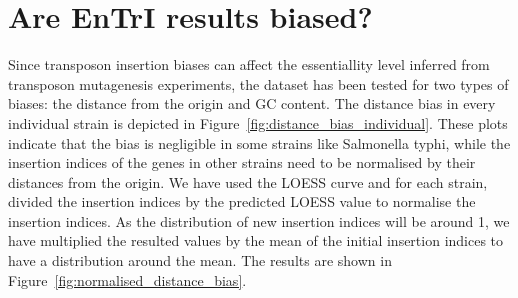 \documentclass[a4paper,10pt, twocolumn]{article}
\begin{document}
\section{Are EnTrI results biased?}
Since transposon insertion biases can affect the essentiallity level inferred from transposon mutagenesis experiments, the dataset has been tested for two types of biases: the distance from the origin and GC content.
The distance bias in every individual strain is depicted in Figure~\ref{fig:distance_bias_individual}. These plots indicate that the bias is negligible in some strains like Salmonella typhi, while the insertion indices of the genes in other strains need to be normalised by their distances from the origin. We have used the LOESS curve and for each strain, divided the insertion indices by the predicted LOESS value to normalise the insertion indices. As the distribution of new insertion indices will be around 1, we have multiplied the resulted values by the mean of the initial insertion indices to have a distribution around the mean. The results are shown in Figure~\ref{fig:normalised_distance_bias}.

\end{document}
